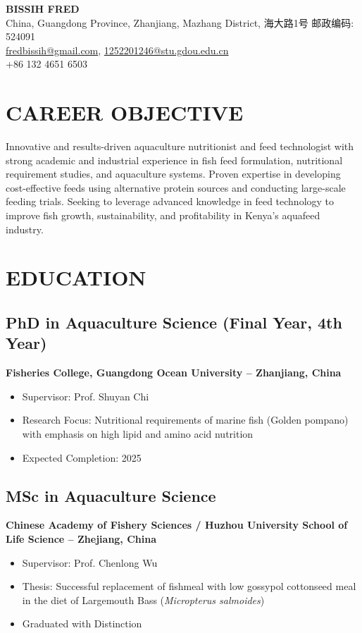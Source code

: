 \documentclass[11pt,a4paper]{article}
\begin{document}
\begin{center}
{\Huge\bfseries BISSIH FRED}\\[0.3cm]
{\color{lightgray}\faMapMarker} China, Guangdong Province, Zhanjiang, Mazhang District, 海大路1号 邮政编码: 524091\\
{\color{lightgray}\faEnvelope} \href{mailto:fredbissih@gmail.com}{fredbissih@gmail.com}, \href{mailto:1252201246@stu.gdou.edu.cn}{1252201246@stu.gdou.edu.cn}\\
{\color{lightgray}\faPhone} +86 132 4651 6503
\end{center}

\vspace{0.5cm}

\section{CAREER OBJECTIVE}
Innovative and results-driven aquaculture nutritionist and feed technologist with strong academic and industrial experience in fish feed formulation, nutritional requirement studies, and aquaculture systems. Proven expertise in developing cost-effective feeds using alternative protein sources and conducting large-scale feeding trials. Seeking to leverage advanced knowledge in feed technology to improve fish growth, sustainability, and profitability in Kenya's aquafeed industry.

\section{EDUCATION}

\subsection{PhD in Aquaculture Science (Final Year, 4th Year)}
\textbf{Fisheries College, Guangdong Ocean University – Zhanjiang, China}
\begin{itemize}[leftmargin=*,noitemsep]
    \item Supervisor: Prof. Shuyan Chi
    \item Research Focus: Nutritional requirements of marine fish (Golden pompano) with emphasis on high lipid and amino acid nutrition
    \item Expected Completion: 2025
\end{itemize}

\subsection{MSc in Aquaculture Science}
\textbf{Chinese Academy of Fishery Sciences / Huzhou University School of Life Science – Zhejiang, China}
\begin{itemize}[leftmargin=*,noitemsep]
    \item Supervisor: Prof. Chenlong Wu
    \item Thesis: Successful replacement of fishmeal with low gossypol cottonseed meal in the diet of Largemouth Bass (\textit{Micropterus salmoides})
    \item Graduated with Distinction
\end{itemize}
\end{document}
